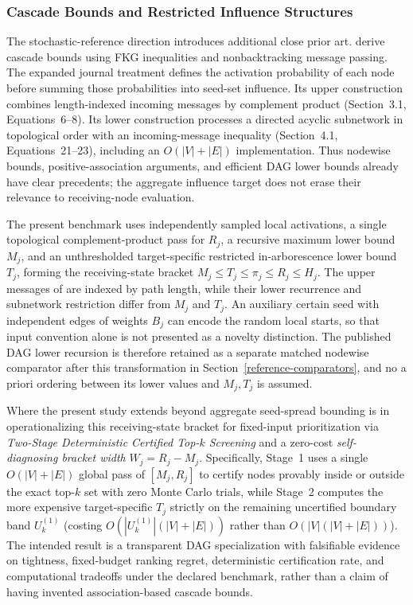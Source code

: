 \subsubsection{Cascade Bounds and Restricted Influence Structures}
\label{cascade-bounds-prior-art}

The stochastic-reference direction introduces additional close prior art.
\citet{abbe2017} derive cascade bounds using FKG inequalities and
nonbacktracking message passing. The expanded journal treatment
\citep{abbe2020} defines the activation probability of each node before
summing those probabilities into seed-set influence. Its upper construction
combines length-indexed incoming messages by complement product
(Section~3.1, Equations~6--8). Its lower construction processes a directed
acyclic subnetwork in topological order with an incoming-message inequality
(Section~4.1, Equations~21--23), including an $O(|V|+|E|)$ implementation.
Thus nodewise bounds, positive-association arguments, and efficient DAG
lower bounds already have clear precedents; the aggregate influence target
does not erase their relevance to receiving-node evaluation.

The present benchmark uses independently sampled local activations, a
single topological complement-product pass for $R_j$, a recursive maximum
lower bound $M_j$, and an unthresholded target-specific restricted
in-arborescence lower bound $T_j$, forming the receiving-state bracket
$M_j \le T_j \le \pi_j \le R_j \le H_j$. The upper messages of \citet{abbe2020}
are indexed by path length, while their lower recurrence
and subnetwork restriction differ from $M_j$ and $T_j$. An auxiliary
certain seed with independent edges of weights $B_j$ can encode the
random local starts, so that input convention alone is not presented as
a novelty distinction. The published DAG lower recursion is therefore
retained as a separate matched nodewise comparator after this
transformation in Section~\ref{reference-comparators}, and no a priori
ordering between its lower values and $M_j, T_j$ is assumed.

Where the present study extends beyond aggregate seed-spread bounding is
in operationalizing this receiving-state bracket for fixed-input
prioritization via \emph{Two-Stage Deterministic Certified Top-$k$
Screening} and a zero-cost \emph{self-diagnosing bracket width}
$W_j = R_j - M_j$. Specifically, Stage~1 uses a single $O(|V|+|E|)$
global pass of $[M_j, R_j]$ to certify nodes provably inside or outside
the exact top-$k$ set with zero Monte Carlo trials, while Stage~2
computes the more expensive target-specific $T_j$ strictly on the
remaining uncertified boundary band $U_k^{(1)}$ (costing
$O(|U_k^{(1)}|(|V|+|E|))$ rather than $O(|V|(|V|+|E|))$). The intended
result is a transparent DAG specialization with falsifiable evidence on
tightness, fixed-budget ranking regret, deterministic certification rate,
and computational tradeoffs under the declared benchmark, rather than a
claim of having invented association-based cascade bounds.

